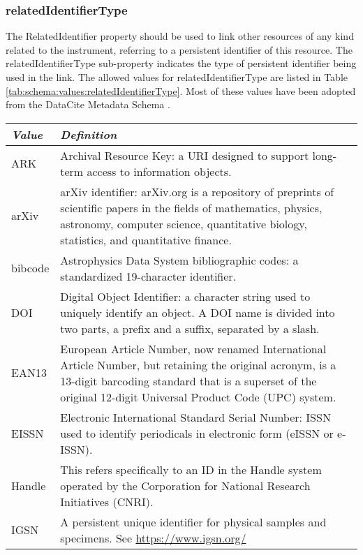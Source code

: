 \documentclass[titlepage=true,twoside=false,DIV=13]{scrartcl}
\begin{document}
\subsubsection{relatedIdentifierType}

The RelatedIdentifier property should be used to link other resources
of any kind related to the instrument, referring to a persistent
identifier of this resource.  The relatedIdentifierType sub-property
indicates the type of persistent identifier being used in the link.
The allowed values for relatedIdentifierType are listed in Table
\ref{tab:schema:values:relatedIdentifierType}.  Most of these values
have been adopted from the DataCite Metadata Schema
\cite{datacite:schema}.

\begin{longtable}{|l|p{\valdefcolw}|}
  \hline
  \emph{Value} & \emph{Definition} \\
  \hline \endhead
  \hline \endfoot\endlastfoot
  ARK     &
  Archival Resource Key: a URI designed to support long-term access to
  information objects.
  \\ \hline
  arXiv   &
  arXiv identifier: arXiv.org is a repository of preprints of
  scientific papers in the fields of mathematics, physics, astronomy,
  computer science, quantitative biology, statistics, and quantitative
  finance.
  \\ \hline
  bibcode &
  Astrophysics Data System bibliographic codes: a standardized
  19-character identifier.
  \\ \hline
  DOI     &
  Digital Object Identifier: a character string used to uniquely
  identify an object.  A DOI name is divided into two parts, a prefix
  and a suffix, separated by a slash.
  \\ \hline
  EAN13   &
  European Article Number, now renamed International Article Number,
  but retaining the original acronym, is a 13-digit barcoding standard
  that is a superset of the original 12-digit Universal Product Code
  (UPC) system.
  \\ \hline
  EISSN   &
  Electronic International Standard Serial Number: ISSN used to
  identify periodicals in electronic form (eISSN or e-ISSN).
  \\ \hline
  Handle  &
  This refers specifically to an ID in the Handle system operated by
  the Corporation for National Research Initiatives (CNRI).
  \\ \hline
  IGSN    &
  A persistent unique identifier for physical samples and specimens.
  See \url{https://www.igsn.org/}
  \\ \hline

\end{longtable}
\end{document}
